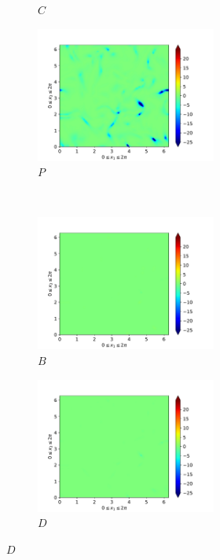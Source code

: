 \begin{figure}[H]
\begin{subfigure}{0.45\textwidth}
        \caption{$C$}
    \end{subfigure}
    \newline
    \begin{subfigure}{0.45\textwidth}
        \includegraphics[height=1.75in]{media/run-cds-65/P-ke-1340}
        \caption{$P$}
    \end{subfigure}
    ~
    \begin{subfigure}{0.45\textwidth}
        \includegraphics[height=1.75in]{media/run-cds-65/B-ke-1340}
        \caption{$B$}
    \end{subfigure}
    \newline
    \begin{subfigure}{0.45\textwidth}
        \includegraphics[height=1.75in]{media/run-cds-65/D-ke-1340}
        \caption{$D$}
    \end{subfigure}
\end{figure}

\newpage

